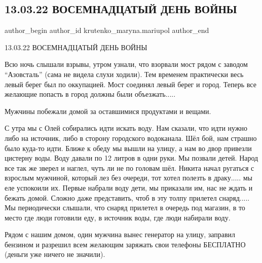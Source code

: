  
 
 
 
 

\subsection{13.03.22 ВОСЕМНАДЦАТЫЙ ДЕНЬ ВОЙНЫ}
\label{sec:13_03_2023.fb.krutenko_maryna.mariupol.1.18_den_13_03}

\ifcmt
 author_begin
   author_id krutenko_maryna.mariupol
 author_end
\fi

13.03.22 ВОСЕМНАДЦАТЫЙ ДЕНЬ ВОЙНЫ

Всю ночь  слышали взрывы, утром узнали, что взорвали мост рядом с заводом
\enquote{Азовсталь} (сама не видела слухи ходили). Тем временем практически весь левый
берег был по оккупацией.  Мост соединял левый берег и город. Теперь все
желающие попасть в город должны были объезжать.....

Мужчины побежали домой за оставшимися продуктами и вещами.

С утра мы с Олей собирались идти искать воду. Нам сказали, что идти нужно либо
на источник, либо в сторону городского водоканала. Шёл бой, нам страшно было
куда-то идти. Ближе к обеду мы вышли на улицу, а нам во двор привезли цистерну
воды. Воду давали по 12 литров в одни руки. Мы позвали детей. Народ все так же
зверел и наглел, чуть ли не по головам шёл. Никита начал ругаться с взрослым
мужчиной, который лез без очереди, тот хотел полезть в драку..... мы еле
успокоили их. Первые набрали воду дети, мы приказали им, нас не ждать и бежать
домой. Сложно даже представить, чтоб в эту толпу прилетел снаряд..... Мы
периодически слышали, что снаряд прилетел в очередь под магазин, в то место где
люди готовили еду, в источник воды, где люди набирали воду. 

Рядом с нашим домом, один мужчина вынес генератор на улицу, заправил бензином и
разрешил всем желающим заряжать свои телефоны БЕСПЛАТНО (деньги уже ничего не
значили).

